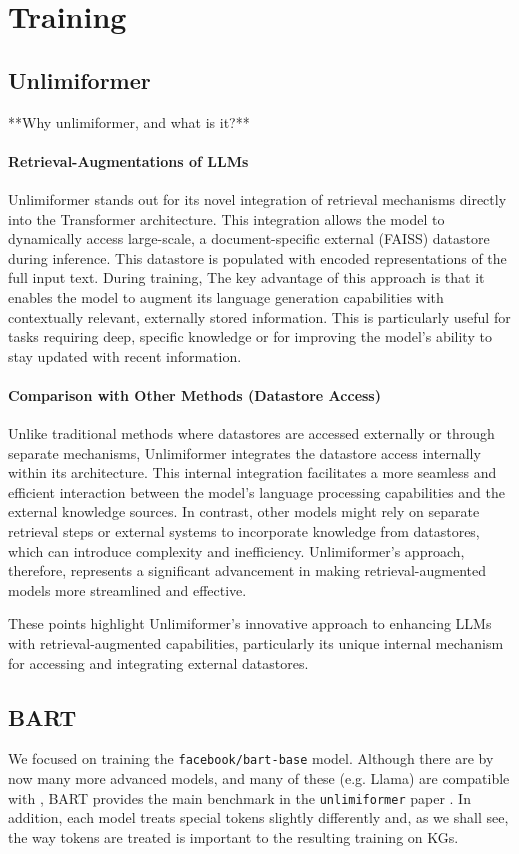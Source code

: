 \documentclass[12pt]{article}
\begin{document}
\section{Training}

\subsection*{Unlimiformer}
**Why unlimiformer, and what is it?**

\paragraph{Retrieval-Augmentations of LLMs} Unlimiformer stands out for its novel
integration of retrieval mechanisms directly into the Transformer architecture.
This integration allows the model to dynamically access large-scale, a
document-specific external
(FAISS) datastore during inference. This datastore is populated with
encoded representations of the full input text. During training,  The key advantage of this
approach is that it enables the model to augment its language generation
capabilities with contextually relevant, externally stored information. This is
particularly useful for tasks requiring deep, specific knowledge or for
improving the model's ability to stay updated with recent information.

\paragraph{Comparison with Other Methods (Datastore Access)} Unlike traditional
methods where datastores are accessed externally or through separate
mechanisms, Unlimiformer integrates the datastore access internally within its
architecture. This internal integration facilitates a more seamless and
efficient interaction between the model's language processing capabilities and
the external knowledge sources. In contrast, other models might rely on
separate retrieval steps or external systems to incorporate knowledge from
datastores, which can introduce complexity and inefficiency. Unlimiformer's
approach, therefore, represents a significant advancement in making
retrieval-augmented models more streamlined and effective.

These points highlight Unlimiformer's innovative approach to enhancing LLMs with retrieval-augmented capabilities, particularly its unique internal mechanism for accessing and integrating external datastores.

\subsection*{BART} We focused on training the \texttt{facebook/bart-base}
model. Although there are by now many more advanced models, and many of these
(e.g. Llama) are compatible with , BART provides the main
benchmark in the \texttt{unlimiformer} paper \cite{bertsch2023unlimiformer}.
In addition, each model treats special tokens slightly differently and, as we
shall see, the way tokens are treated is important to the resulting training on
KGs.
\end{document}
